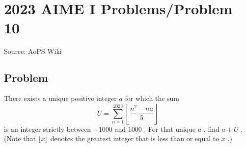 \documentclass[12pt]{article}
\begin{document}
\section*{{2023 AIME I Problems/Problem 10}}
Source: AoPS Wiki

\subsection*{Problem}
There exists a unique positive integer $a$ for which the sum \[U=\sum_{n=1}^{2023}\left\lfloor\dfrac{n^{2}-na}{5}\right\rfloor\] is an integer strictly between $-1000$ and $1000$ . For that unique $a$ , find $a+U$ . (Note that $\lfloor x\rfloor$ denotes the greatest integer that is less than or equal to $x$ .)
\end{document}
